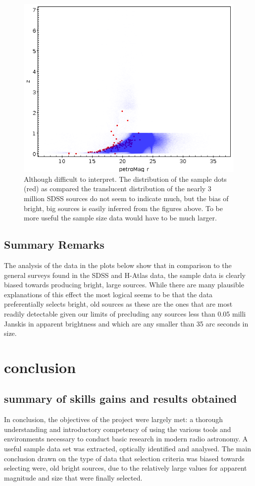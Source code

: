 \documentclass{article}
\begin{document}
\begin{figure}
    \centering
    \includegraphics[scale = 0.4]{combizp.png}
    \caption{Although difficult to interpret. The distribution of the sample dots (red) as compared the translucent distribution of the nearly 3 million SDSS sources do not seem to indicate much, but the bias of bright, big sources is easily inferred from the figures above. To be more useful the sample size data would have to be much larger.}
\end{figure}


\subsection{Summary Remarks}

The analysis of the data in the plots below show that in comparison to the general surveys found in the SDSS and H-Atlas data, the sample data is clearly biased towards producing bright, large sources. While there are many plausible explanations of this effect the most logical seems to be that the data preferentially selects bright, old sources as these are the ones that are most readily detectable given our limits of precluding any sources less than 0.05 milli Janskis in apparent brightness and which are any smaller than 35 arc seconds in size.

\section{conclusion}
\subsection{summary of skills gains and results obtained}
In conclusion, the objectives of the project were largely met: a thorough understanding and introductory competency of using the various tools and environments necessary to conduct basic research in modern radio astronomy. A useful sample data set was extracted, optically identified and analysed. The main conclusion drawn on the type of data that selection criteria was biased towards selecting were, old bright sources, due to the relatively large values for apparent magnitude and size that were finally selected.
\end{document}
